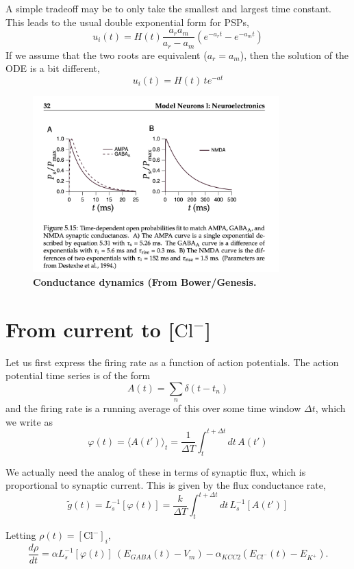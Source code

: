 \documentclass[11pt,oneside]{amsart}
\begin{document}
A simple tradeoff may be to only take the smallest and largest time constant. This leads to the usual double exponential form for PSPs, 
\begin{equation}
    u_i(t)= H(t)\frac{a_ra_m}{a_r-a_m} ( e^{-a_r t}-  e^{-a_mt})
\end{equation}
If we assume that the two roots are equivalent ($a_r =a_m$), then the solution of the ODE is a bit different, 
\begin{equation}
    u_i(t)= H(t) \, t e^{-a t}
\end{equation}


\begin{figure}[t!]
    \centering
    \includegraphics[width=9.5cm]{figures/conductances.png}
    \caption{{\bf Conductance dynamics (From Bower/Genesis.}}
    \label{fig:linear}
\end{figure}
\section{From current to {[$\mbox{Cl}^-$]} }
Let us first express the firing rate as a function of action potentials.
The action potential time series is of the form
$$
A(t) = \sum_n \delta(t-t_n) 
$$
and the firing rate is a running average of this over some time window $\Delta t$, which we write as 
$$
\varphi(t) = \langle A(t') \rangle_t  = 
 \frac{ 1}{\Delta T} \int_t^{t+\Delta t} dt\,  A(t')  
$$

We actually need the analog of these in terms of synaptic flux, which is proportional to synaptic current. This is given by the flux conductance rate, 
$$
\tilde g(t)= L_s^{-1}[\varphi(t)] =  \frac{ k}{\Delta T} \int_t^{t+\Delta t} dt\,  L_s^{-1}[A(t')] 
$$

 Letting $\rho(t) = [\text {Cl}^{-}]_i$,
$$
\frac{d\rho}{dt} =  \alpha  L_s^{-1}[\varphi(t)] \ (E_{GABA}(t) - V_m) - \alpha_{KCC2} \left( E_{Cl^-}(t) -  E_{K^+} \right).
$$
\end{document}
